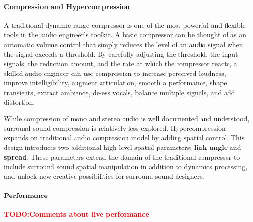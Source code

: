 \documentclass{tufte-book}
\newcommand{\TODO}[1]{\textcolor{red}{\bf TODO:#1}\xspace}
\newcommand{\thesis}{Hypercompression\xspace}
\begin{document}
\paragraph{Compression and Hypercompression} A traditional
dynamic range compressor is one of the most powerful and flexible
tools in the audio engineer's toolkit.  A basic compressor can be
thought of as an automatic volume control that simply reduces the
level of an audio signal when the signal exceeds a threshold. By
carefully adjusting the threshold, the input signals, the reduction
amount, and the rate at which the compressor reacts, a skilled audio
engineer can use compression to increase perceived loudness, improve
intelligibility, augment articulation, smooth a performance, shape
transients, extract ambience, de-ess vocals, balance multiple signals,
and add distortion.\cite{Case2007}

While compression of mono and stereo audio is well documented and
understood,\cite{Giannoulis2012, Blesser1969, Katz2007, Case2007}
surround sound compression is relatively less explored.  \thesis
expands on traditional audio compression model by adding 
spatial control. This design introduces two additional high level
spatial parameters: \textbf{link angle} and \textbf{spread}. These
parameters extend the domain of the traditional compressor to include
surround sound spatial manipulation in addition to dynamics
processing, and unlock new creative possibilities for surround sound
designers.

\paragraph{Performance}
\TODO{Comments about live performance}
\end{document}
